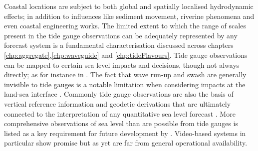 Coastal locations are subject to both global and spatially localised hydrodynamic effects; in addition to influences like sediment movement, riverine phenomena and even coastal engineering works.  The limited extent to which the range of scales present in the tide gauge observations can be adequately represented by any forecast system is a fundamental characterisation discussed across chapters \ref{chp:aggregate},\ref{chp:waveguide} and \ref{chp:tideFlavours}.    
Tide gauge observations can be mapped to certain sea level impacts and decisions, though not always directly; as for instance in \citep{Hague:2019ha}.    The fact that wave run-up and swash are generally invisible to tide gauges is a notable limitation when considering impacts at the land-sea interface \citep{Serafin:2017fl,10.1007/s11069-020-04178-3}.
Commonly tide gauge observations are also the basis of vertical reference information and geodetic derivations that are ultimately connected to the interpretation of any quantitative sea level forecast \citep{Woppelmann:2006un}\citep{AVWS2021}.
More comprehensive observations of sea level than are possible from tide gauges is listed as a key requirement for future development by \citeauthor{10.3389/fmars.2019.00437}.    Video-based systems in particular show promise \citep{10.1175/jtech-d-18-0203.1 m,10.1002/2014gl060517} but as yet are far from general operational availability. 
